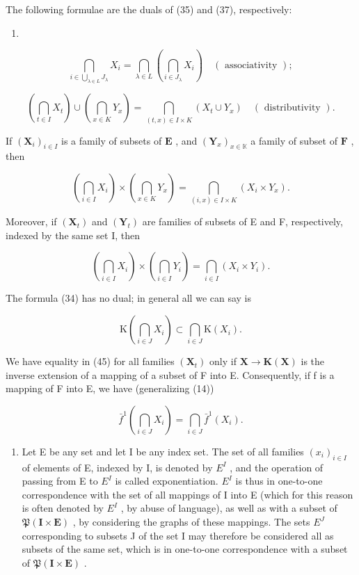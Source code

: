 The following formulae are the duals of (35) and (37), respectively:

\begin{enumerate}
\def\labelenumi{(\arabic{enumi})}
\setcounter{enumi}{40}
\tightlist
\item
\end{enumerate}

\[
\bigcap_ {i \in \bigcup_ {\lambda \in L} J _ {\lambda}} X _ {i} = \bigcap_ {\lambda \in L} \left(\bigcap_ {i \in J _ {\lambda}} X _ {i}\right) \quad (\text { associativity });\tag{42}
\]

\[
\left(\bigcap_ {t \in I} X _ {t}\right) \cup \left(\bigcap_ {x \in K} Y _ {x}\right) = \bigcap_ {(t, x) \in I \times K} (X _ {t} \cup Y _ {x}) \quad (\text { distributivity }).
\]

If \((\mathbf{X}_i)_{i\in I}\) is a family of subsets of \(\mathbf{E}\) , and \((\mathbf{Y}_x)_{x\in \mathbb{K}}\) a family of subset of \(\mathbf{F}\) , then

\[
\left(\bigcap_ {i \in I} X _ {i}\right) \times \left(\bigcap_ {x \in K} Y _ {x}\right) = \bigcap_ {(i, x) \in I \times K} (X _ {i} \times Y _ {x}).\tag{43}
\]

Moreover, if \((\mathbf{X}_{t})\) and \((\mathbf{Y}_{t})\) are families of subsets of E and F, respectively, indexed by the same set I, then

\[
\left(\bigcap_ {i \in I} X _ {i}\right) \times \left(\bigcap_ {i \in I} Y _ {i}\right) = \bigcap_ {i \in I} (X _ {i} \times Y _ {i}).\tag{44}
\]

The formula (34) has no dual; in general all we can say is

\[
\mathrm{K} \left(\bigcap_ {i \in J} X _ {i}\right) \subset \bigcap_ {i \in J} \mathrm{K} (X _ {i}).\tag{45}
\]

We have equality in (45) for all families \((\mathbf{X}_{t})\) only if \(\mathbf{X} \to \mathbf{K}(\mathbf{X})\) is the inverse extension of a mapping of a subset of F into E. Consequently, if f is a mapping of F into E, we have (generalizing (14))

\[
\bar {f} ^ {1} \left(\bigcap_ {i \in J} X _ {i}\right) = \bigcap_ {i \in J} \bar {f} ^ {1} (X _ {i}).\tag{46}
\]

\begin{enumerate}
\def\labelenumi{\arabic{enumi}.}
\setcounter{enumi}{8}
\tightlist
\item
  Let E be any set and let I be any index set. The set of all families \((x_{i})_{i\in I}\) of elements of E, indexed by I, is denoted by \(E^{I}\) , and the operation of passing from E to \(E^{I}\) is called exponentiation. \(E^{I}\) is thus in one-to-one correspondence with the set of all mappings of I into E (which for this reason is often denoted by \(E^{I}\) , by abuse of language), as well as with a subset of \(\mathfrak{P}(\mathbf{I} \times \mathbf{E})\) , by considering the graphs of these mappings. The sets \(E^{J}\) corresponding to subsets J of the set I may therefore be considered all as subsets of the same set, which is in one-to-one correspondence with a subset of \(\mathfrak{P}(\mathbf{I} \times \mathbf{E})\) .
\end{enumerate}

